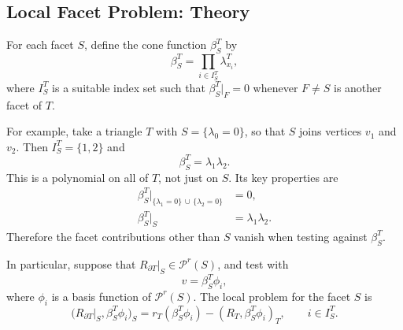 \documentclass[12pt,a4paper]{article}
\newcommand{\PP}{\mathcal{P}}
\begin{document}
\subsection{Local Facet Problem: Theory}
For each facet $S$, define the cone function $\beta_S^T$ by
\begin{equation}
    \beta_S^T=\prod_{i\in I_S^T}\lambda_{x_i}^{T},
\end{equation}
where $I_S^T$ is a suitable index set such that $\beta_S^T|_F=0$ whenever $F\ne S$ is another facet of $T$.

For example, take a triangle $T$ with $S=\{\lambda_0=0\}$, so that $S$ joins vertices $v_1$ and $v_2$. Then $I_S^T=\{1,2\}$ and
\begin{equation}
    \beta_S^T=\lambda_1\lambda_2.
\end{equation}
This is a polynomial on all of $T$, not just on $S$. Its key properties are
\begin{align}
    \beta_S^T|_{\{\lambda_1=0\}\,\cup\,\{\lambda_2=0\}}&=0,\\
    \beta_S^T|_S&=\lambda_1\lambda_2.
\end{align}
Therefore the facet contributions other than $S$ vanish when testing against $\beta_S^T$.

In particular, suppose that $R_{\partial T}|_S\in\PP^r(S)$, and test with
\begin{equation}
    v=\beta_S^T\phi_i,
\end{equation}
where $\phi_i$ is a basis function of $\PP^r(S)$. The local problem for the facet $S$ is
\begin{equation}
    \bigl(R_{\partial T}|_S,\beta_S^T\phi_i\bigr)_S
    =r_T(\beta_S^T\phi_i)
     -(R_T,\beta_S^T\phi_i)_T,
    \qquad i\in I_S^T.
\end{equation}
\end{document}
